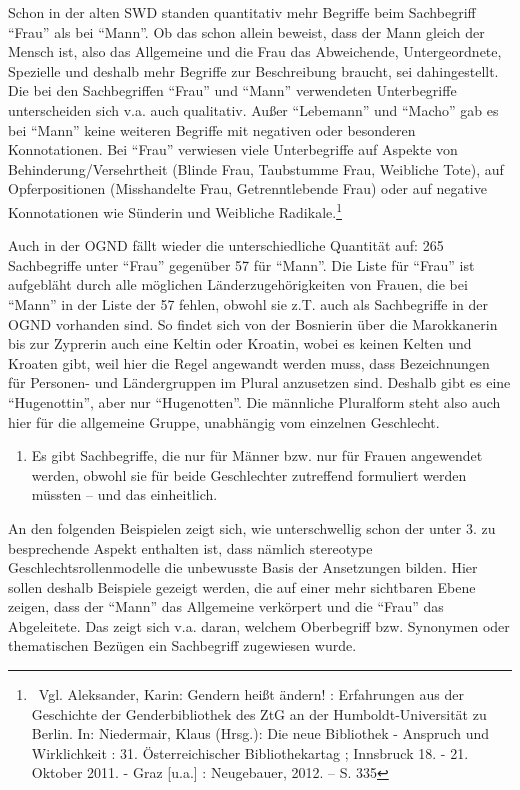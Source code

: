 \documentclass[a4paper,
fontsize=11pt,
oneside,
numbers=noperiodatend,
parskip=half-,
bibliography=totoc,
final
]{scrartcl}
\begin{document}
Schon in der alten SWD standen quantitativ mehr Begriffe beim
Sachbegriff \enquote{Frau} als bei \enquote{Mann}. Ob das schon allein
beweist, dass der Mann gleich der Mensch ist, also das Allgemeine und
die Frau das Abweichende, Untergeordnete, Spezielle und deshalb mehr
Begriffe zur Beschreibung braucht, sei dahingestellt. Die bei den
Sachbegriffen \enquote{Frau} und \enquote{Mann} verwendeten
Unterbegriffe unterscheiden sich v.a. auch qualitativ. Außer
\enquote{Lebemann} und \enquote{Macho} gab es bei \enquote{Mann} keine
weiteren Begriffe mit negativen oder besonderen Konnotationen. Bei
\enquote{Frau} verwiesen viele Unterbegriffe auf Aspekte von
Behinderung/Versehrtheit (Blinde Frau, Taubstumme Frau, Weibliche Tote),
auf Opferpositionen (Misshandelte Frau, Getrenntlebende Frau) oder auf
negative Konnotationen wie Sünderin und Weibliche Radikale.\footnote{~Vgl.
  Aleksander, Karin: Gendern heißt ändern! : Erfahrungen aus der
  Geschichte der Genderbibliothek des ZtG an der Humboldt-Universität zu
  Berlin. In: Niedermair, Klaus (Hrsg.): Die neue Bibliothek - Anspruch
  und Wirklichkeit : 31. Österreichischer Bibliothekartag ; Innsbruck
  18. - 21. Oktober 2011. - Graz {[}u.a.{]} : Neugebauer, 2012. -- S.
  335}

Auch in der OGND fällt wieder die unterschiedliche Quantität auf: 265
Sachbegriffe unter \enquote{Frau} gegenüber 57 für \enquote{Mann}. Die
Liste für \enquote{Frau} ist aufgebläht durch alle möglichen
Länderzu\-ge\-hörig\-keiten von Frauen, die bei \enquote{Mann} in der Liste
der 57 fehlen, obwohl sie z.T. auch als Sachbegriffe in der OGND
vorhanden sind. So findet sich von der Bosnierin über die Marokkanerin
bis zur Zyprerin auch eine Keltin oder Kroatin, wobei es keinen Kelten
und Kroaten gibt, weil hier die Regel angewandt werden muss, dass
Bezeichnungen für Personen- und Ländergruppen im Plural anzusetzen sind.
Deshalb gibt es eine \enquote{Hugenottin}, aber nur
\enquote{Hugenotten}. Die männliche Pluralform steht also auch hier für
die allgemeine Gruppe, unabhängig vom einzelnen Geschlecht.

\begin{enumerate}
\def\labelenumi{\arabic{enumi}.}
\setcounter{enumi}{1}
\itemsep1pt\parskip0pt
\item
  Es gibt Sachbegriffe, die nur für Männer bzw. nur für Frauen
  angewendet werden, obwohl sie für beide Geschlechter zutreffend
  formuliert werden müssten -- und das einheitlich.
\end{enumerate}

An den folgenden Beispielen zeigt sich, wie unterschwellig schon der
unter 3. zu besprechende Aspekt enthalten ist, dass nämlich stereotype
Geschlechtsrollenmodelle die unbewusste Basis der Ansetzungen bilden.
Hier sollen deshalb Beispiele gezeigt werden, die auf einer mehr
sichtbaren Ebene zeigen, dass der \enquote{Mann} das Allgemeine
verkörpert und die \enquote{Frau} das Abgeleitete. Das zeigt sich v.a.
daran, welchem Oberbegriff bzw. Synonymen oder thematischen Bezügen ein
Sachbegriff zugewiesen wurde.
\end{document}
